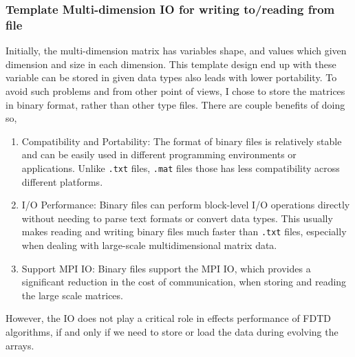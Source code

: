 \subsubsection{Template Multi-dimension IO for writing to/reading from file}
Initially, the multi-dimension matrix has variables shape, 
and values which given dimension and size in each dimension.
This template design end up with these variable can be stored in given data types also leads with lower 
portability.
To avoid such problems and from other point of views, I chose to store the matrices in binary format, 
rather than other type files.
There are couple benefits of doing so,
\begin{enumerate}
  \item 	Compatibility and Portability: The format of binary files is relatively 
  stable and can be easily used in different programming environments or applications. 
  Unlike \texttt{.txt} files, \texttt{.mat} files those has less compatibility across different platforms.
  \item I/O Performance: Binary files can perform block-level I/O operations directly 
  without needing to parse text formats or convert data types. 
  This usually makes reading and writing binary files much faster than \texttt{.txt} files, 
  especially when dealing with large-scale multidimensional matrix data.
  \item Support MPI IO: Binary files support the MPI IO, which provides a significant reduction in the 
  cost of communication, when storing and reading the large scale matrices. 
\end{enumerate}
However, the IO does not play a critical role in effects performance of FDTD algorithms, if and only if 
we need to store or load the data during evolving the arrays.
























































